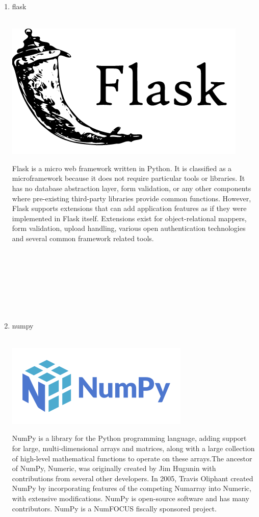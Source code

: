 \documentclass[conference]{IEEEtran}
\begin{document}
\begin{enumerate}
    \break
    
    \item flask\\ \\
    \centerline{\includegraphics[scale=0.5]{assets/flask.png}}
    Flask is a micro web framework written in Python. It is classified as a microframework because it does not require particular tools or libraries. It has no database abstraction layer, form validation, or any other components where pre-existing third-party libraries provide common functions. However, Flask supports extensions that can add application features as if they were implemented in Flask itself. Extensions exist for object-relational mappers, form validation, upload handling, various open authentication technologies and several common framework related tools. \\ \\ \\ \\ \\ \\ \\ \\
    
    \item numpy \\ \\
    \centerline{\includegraphics[scale=0.5]{assets/numpy.png}}
    NumPy is a library for the Python programming language, adding support for large, multi-dimensional arrays and matrices, along with a large collection of high-level mathematical functions to operate on these arrays.The ancestor of NumPy, Numeric, was originally created by Jim Hugunin with contributions from several other developers. In 2005, Travis Oliphant created NumPy by incorporating features of the competing Numarray into Numeric, with extensive modifications. NumPy is open-source software and has many contributors. NumPy is a NumFOCUS fiscally sponsored project. \\ \\
    

\end{enumerate}
\end{document}
